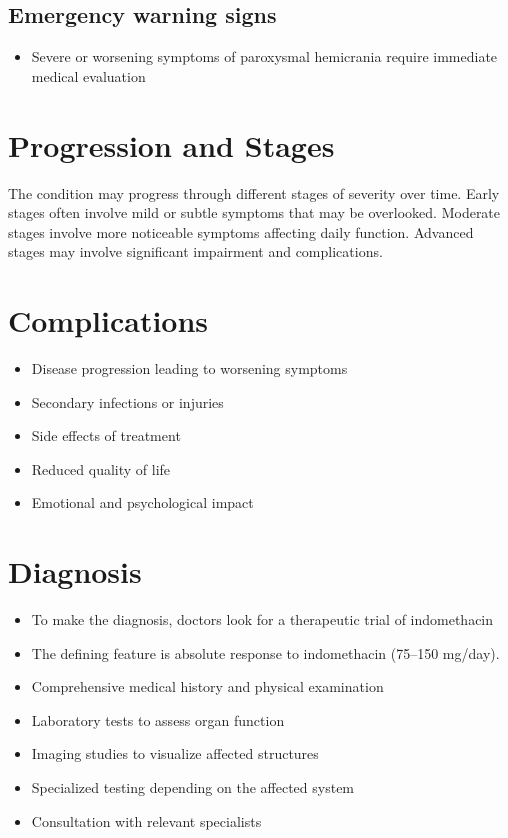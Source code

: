\subsection{Emergency warning signs}
\begin{itemize}[noitemsep]
  \item Severe or worsening symptoms of paroxysmal hemicrania require immediate medical evaluation
\end{itemize}
\section{Progression and Stages}
The condition may progress through different stages of severity over time. Early stages often involve mild or subtle symptoms that may be overlooked. Moderate stages involve more noticeable symptoms affecting daily function. Advanced stages may involve significant impairment and complications.
\section{Complications}
\begin{itemize}[noitemsep]
  \item Disease progression leading to worsening symptoms
  \item Secondary infections or injuries
  \item Side effects of treatment
  \item Reduced quality of life
  \item Emotional and psychological impact
\end{itemize}
\section{Diagnosis}
\begin{itemize}[noitemsep]
  \item To make the diagnosis, doctors look for a therapeutic trial of indomethacin
  \item The defining feature is absolute response to indomethacin (75--150 mg/day).
  \item Comprehensive medical history and physical examination
  \item Laboratory tests to assess organ function
  \item Imaging studies to visualize affected structures
  \item Specialized testing depending on the affected system
  \item Consultation with relevant specialists
\end{itemize}
